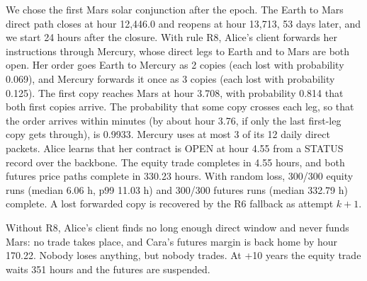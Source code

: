\documentclass[10pt,letterpaper]{article}
\makeatletter
\renewcommand\paragraph{\@startsection{paragraph}{4}{\z@}{4pt plus 1pt}{-0.6em}{\normalfont\normalsize\bfseries}}
\makeatother
\begin{document}
\paragraph{Difficult epoch.} We chose the first Mars solar conjunction after the epoch. The Earth to Mars direct path
closes at hour 12,446.0 and reopens at hour 13,713, 53 days later, and we start
24 hours after the closure. With rule R8, Alice's client forwards her instructions through Mercury, whose direct legs to Earth and to Mars
are both open. Her order goes Earth to Mercury as 2 copies (each lost with probability
0.069), and Mercury forwards it once as 3 copies (each lost with
probability 0.125). The first copy reaches Mars at hour
3.708, with probability 0.814 that both first copies
arrive. The probability that some copy crosses each leg, so that the order arrives within minutes (by about hour
3.76, if only the last first-leg copy gets through), is 0.9933. Mercury uses at most
3 of its 12 daily direct packets. Alice learns that her contract is OPEN at hour
4.55 from a STATUS record over the backbone. The equity trade completes in
4.55 hours, and both futures price paths complete in
330.23 hours. With random loss, 300/300 equity
runs (median 6.06 h, p99 11.03 h) and 300/300 futures runs (median
332.79 h) complete. A lost forwarded copy is recovered by the R6 fallback as attempt $k + 1$.

Without R8, Alice's client finds no long enough direct window and never funds Mars: no trade takes place, and Cara's
futures margin is back home by hour 170.22. Nobody loses anything, but nobody trades. At +10 years the equity
trade waits 351 hours and the futures are suspended.
\end{document}
